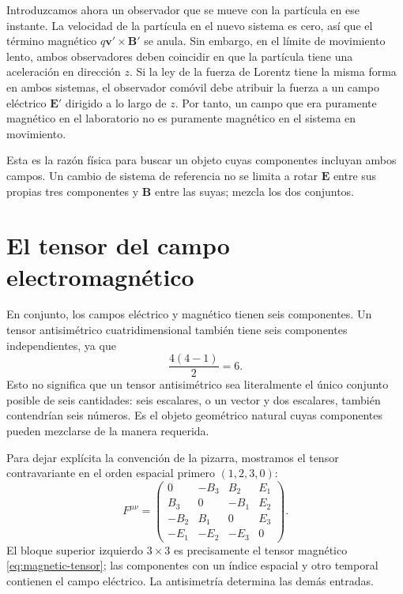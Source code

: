 Introduzcamos ahora un observador que se mueve con la partícula en ese instante. La velocidad de la partícula en el nuevo sistema es cero, así que el término magnético \(q\boldsymbol v'\times\boldsymbol B'\) se anula. Sin embargo, en el límite de movimiento lento, ambos observadores deben coincidir en que la partícula tiene una aceleración en dirección \(z\). Si la ley de la fuerza de Lorentz tiene la misma forma en ambos sistemas, el observador comóvil debe atribuir la fuerza a un campo eléctrico \(\boldsymbol E'\) dirigido a lo largo de \(z\). Por tanto, un campo que era puramente magnético en el laboratorio no es puramente magnético en el sistema en movimiento.

Esta es la razón física para buscar un objeto cuyas componentes incluyan ambos campos. Un cambio de sistema de referencia no se limita a rotar \(\boldsymbol E\) entre sus propias tres componentes y \(\boldsymbol B\) entre las suyas; mezcla los dos conjuntos.

\section{El tensor del campo electromagnético}

En conjunto, los campos eléctrico y magnético tienen seis componentes. Un tensor antisimétrico cuatridimensional también tiene seis componentes independientes, ya que \begin{equation}
  \frac{4(4-1)}{2}=6.
\end{equation} Esto no significa que un tensor antisimétrico sea literalmente el único conjunto posible de seis cantidades: seis escalares, o un vector y dos escalares, también contendrían seis números. Es el objeto geométrico natural cuyas componentes pueden mezclarse de la manera requerida.

Para dejar explícita la convención de la pizarra, mostramos el tensor contravariante en el orden espacial primero \((1,2,3,0)\): \begin{equation}
  F^{\mu\nu}=
  \begin{pmatrix}
    0 & -B_3 & B_2 & E_1 \\
    B_3 & 0 & -B_1 & E_2 \\
    -B_2 & B_1 & 0 & E_3 \\
    -E_1 & -E_2 & -E_3 & 0
  \end{pmatrix}.
  \label{eq:l07-field-tensor}
\end{equation} El bloque superior izquierdo \(3\times3\) es precisamente el tensor magnético \eqref{eq:magnetic-tensor}; las componentes con un índice espacial y otro temporal contienen el campo eléctrico. La antisimetría determina las demás entradas.

